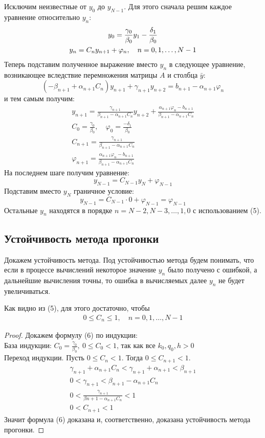 \documentclass[titlepage]{article}
\def\le{\leqslant}
\begin{document}
Исключим неизвестные от $y_0$ до $y_{N-1}$. Для этого сначала решим каждое уравнение относительно $y_n$:
\begin{gather}
	\notag y_0 = \frac{\gamma_0}{\beta_0}y_1 - \frac{\delta_1}{\beta_0} \\
		   y_n = C_n y_{n+1} + \varphi_n, \quad n = 0,1,\dots,N-1
\end{gather}
Теперь подставим полученное выражение вместо $y_n$ в следующее уравнение, возникающее вследствие перемножения матрицы $A$ и столбца $\bar y$:
$$(-\beta_{n+1} + \alpha_{n+1}C_n)y_{n+1} + \gamma_{n+1}y_{n+2} = b_{n+1} - \alpha_{n+1}\varphi_n$$
и тем самым получим:
\begin{gather*}
	y_{n+1} = \frac{\gamma_{n+1}}{\beta_{n+1} - \alpha_{n+1}C_n}y_{n+2} + \frac{\alpha_{n+1}\varphi_n - b_{n+1}}{\beta_{n+1} - \alpha_{n+1}C_n} \\
	C_0 = \frac{\gamma_0}{\beta_0}, \quad \varphi_0 = \frac{-\delta_1}{\beta_0} \\
	C_{n+1} = \frac{\gamma_{n+1}}{\beta_{n+1}-\alpha_{n+1}C_n} \\
	\varphi_{n+1} = \frac{\alpha_{n+1}\varphi_n - b_{n+1}}{\beta_{n+1} - \alpha_{n+1}C_n}
\end{gather*}
На последнем шаге получим уравнение:
$$y_{N-1} = C_{N-1}y_N + \varphi_{N-1}$$
Подставим вместо $y_N$ граничное условие:
$$y_{N-1} = C_{N-1}\cdot0 + \varphi_{N-1} = \varphi_{N-1}$$
Остальные $y_n$ находятся в порядке $n = N-2, N-3, \dots, 1, 0$ с использованием (5).

\subsection{Устойчивость метода прогонки}
Докажем устойчивость метода. Под устойчивостью метода будем понимать, что если в процессе вычислений некоторое значение $y_n$ было получено с ошибкой, а дальнейшие вычисления точны, то ошибка в вычисляемых далее $y_n$ не будет увеличиваться.

Как видно из (5), для этого достаточно, чтобы
\begin{gather}
	0 \le C_n \le 1, \quad n = 0,1,\dots,N-1
\end{gather}

\begin{proof}
Докажем формулу (6) по индукции:\\
База индукции: $C_0 = \frac{\gamma_0}{\beta_0}, \ 0 \le C_0 < 1$, так как все $k_0, q_0, h > 0$ \\
Переход индукции. Пусть $0 \le C_n < 1$. Тогда $0 \le C_{n+1} < 1$.
\begin{gather*}
	\gamma_{n+1} + \alpha_{n+1}C_n < \gamma_{n+1} + \alpha_{n+1} < \beta_{n+1} \\
	0 < \gamma_{n+1} < \beta_{n+1} - \alpha_{n+1}C_n \\
	0 < \frac{\gamma_{n+1}}{\beta{n+1} - \alpha_{n+1}C_n} < 1 \\
	0 < C_{n+1} < 1
\end{gather*}
Значит формула (6) доказана и, соответственно, доказана устойчивость метода прогонки.	
\end{proof}
\end{document}
